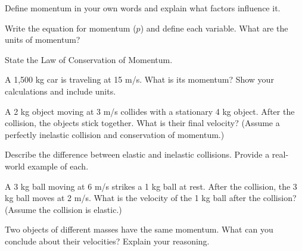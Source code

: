 \begin{questions}
\begin{questions}
\question Define momentum in your own words and explain what factors influence it. \qspp

\question Write the equation for momentum ($p$) and define each variable. What are the units of momentum? \qspp

\question State the Law of Conservation of Momentum. \qspp

\question A 1,500 kg car is traveling at 15 m/s. What is its momentum? Show your calculations and include units. \qspp

\question A 2 kg object moving at 3 m/s collides with a stationary 4 kg object. After the collision, the objects stick together. What is their final velocity? (Assume a perfectly inelastic collision and conservation of momentum.) \qspp

\question Describe the difference between elastic and inelastic collisions. Provide a real-world example of each. \qspp

\question A 3 kg ball moving at 6 m/s strikes a 1 kg ball at rest. After the collision, the 3 kg ball moves at 2 m/s. What is the velocity of the 1 kg ball after the collision? (Assume the collision is elastic.) \qspp

\question Two objects of different masses have the same momentum. What can you conclude about their velocities? Explain your reasoning. \qspp



\end{questions}


\end{questions}

